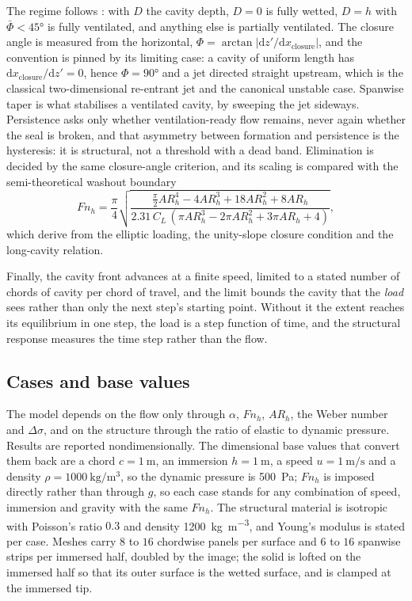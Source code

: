 \documentclass[11pt,a4paper]{article}
\newcommand{\Fnh}{\mathit{Fn}_h}
\newcommand{\ARh}{\mathit{AR}_h}
\newcommand{\dd}{\mathrm{d}}
\begin{document}
The regime follows \citet{Harwood2016}: with $D$ the cavity depth,
$D = 0$ is fully wetted, $D = h$ with $\bar{\Phi} < \ang{45}$ is fully
ventilated, and anything else is partially ventilated. The closure angle is
measured from the horizontal, $\Phi = \arctan|\dd z'/\dd x_{\mathrm{closure}}|$,
and the convention is pinned by its limiting case: a cavity of uniform length has
$\dd x_{\mathrm{closure}}/\dd z' = 0$, hence $\Phi = \ang{90}$ and a jet directed
straight upstream, which is the classical two-dimensional re-entrant jet and the
canonical unstable case. Spanwise taper is what stabilises a ventilated cavity,
by sweeping the jet sideways. Persistence asks only whether ventilation-ready
flow remains, never again whether the seal is broken, and that asymmetry between
formation and persistence is the hysteresis: it is structural, not a
threshold with a dead band. Elimination is decided by the same closure-angle
criterion, and its scaling is compared with the semi-theoretical washout boundary
%
\begin{equation}
  \Fnh = \frac{\pi}{4}
   \sqrt{\frac{\tfrac{\pi}{2}\ARh^{4} - 4\ARh^{3} + 18\ARh^{2} + 8\ARh}
              {2.31\,C_L\,(\pi \ARh^{3} - 2\pi \ARh^{2} + 3\pi \ARh + 4)}} ,
  \label{eq:washout}
\end{equation}
%
which \citet{Harwood2016} derive from the elliptic loading, the unity-slope
closure condition and the long-cavity relation.

Finally, the cavity front advances at a finite speed, limited to a stated number
of chords of cavity per chord of travel, and the limit bounds the cavity that the
\emph{load} sees rather than only the next step's starting point. Without it the
extent reaches its equilibrium in one step, the load is a step function of time,
and the structural response measures the time step rather than the flow.

\subsection{Cases and base values}
\label{subsec:Cases}

The model depends on the flow only through $\alpha$, $\Fnh$, $\ARh$, the Weber
number and $\Delta\sigma$, and on the structure through the ratio of elastic to
dynamic pressure. Results are reported nondimensionally. The dimensional base
values that convert them back are a chord $c = \SI{1}{\metre}$, an immersion
$h = \SI{1}{\metre}$, a speed $u = \SI{1}{\metre\per\second}$ and a density
$\rho = \SI{1000}{\kilogram\per\cubic\metre}$, so the dynamic pressure is \SI{500}{\pascal};
$\Fnh$ is imposed directly rather than through $g$, so each case stands for any
combination of speed, immersion and gravity with the same $\Fnh$. The structural
material is isotropic with Poisson's ratio $0.3$ and density
\SI{1200}{\kilogram\per\cubic\metre}, and Young's modulus is stated per case. Meshes carry $8$
to $16$ chordwise panels per surface and $6$ to $16$ spanwise strips per
immersed half, doubled by the image; the solid is lofted on the immersed half so
that its outer surface is the wetted surface, and is clamped at the immersed tip.
\end{document}
